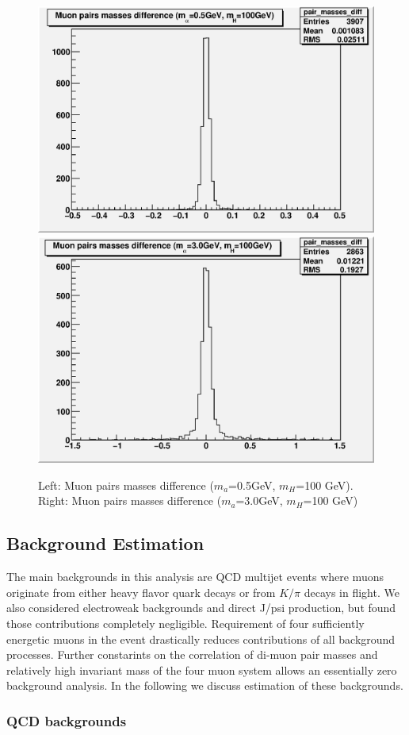 \documentclass[aps,12pt,superscriptaddress,nofootinbib,floatfix,showpacs]{revtex4}
\begin{document}
\begin{figure}[htb]
\begin{center}
\includegraphics[width=0.48\linewidth]{plots/pairs_masses_diff_0.5.eps}
\includegraphics[width=0.48\linewidth]{plots/pairs_masses_diff_3.0.eps}
\caption{Left: Muon pairs masses difference ($m_a$=0.5GeV, $m_H$=100 GeV). 
Right: Muon pairs masses difference ($m_a$=3.0GeV, $m_H$=100 GeV)}
\label{muon_pairs_masses_diff}
\end{center}
\end{figure}

\subsection{Background Estimation}
The main backgrounds in this analysis are QCD multijet events where muons originate
from either heavy flavor quark decays or from $K/\pi$ decays in flight. We also
considered electroweak backgrounds and direct J/psi production, but found those
contributions completely negligible. Requirement of four  sufficiently energetic muons
in the event drastically reduces contributions of all background processes.  Further
constarints on the correlation of di-muon pair masses and relatively high invariant
mass of the four muon system allows an essentially zero background analysis. In the
following we discuss estimation  of these backgrounds.

\subsubsection{QCD backgrounds}
\end{document}
